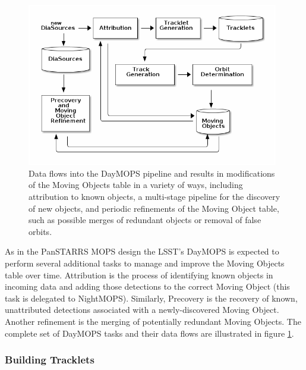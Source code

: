 \documentclass[12pt,preprint]{aastex}
\begin{document}
\begin{figure}[h]
\begin{center}
  \includegraphics[width=11cm]{illustrations/mopsDiagram.png}
\end{center}
\caption{ Data flows into the DayMOPS pipeline and results in
  modifications of the Moving Objects table in a variety of ways,
  including attribution to known objects, a multi-stage pipeline for
  the discovery of new objects, and periodic refinements of the Moving
  Object table, such as possible merges of redundant objects or
  removal of false orbits. }
\label{mopsDiagram}
\end{figure}



As in the PanSTARRS MOPS design \citep{psMOPSDesign} the LSST's
DayMOPS is expected to perform several additional tasks to manage and
improve the Moving Objects table over time.  Attribution is the
process of identifying known objects in incoming data and adding those
detections to the correct Moving Object (this task is delegated to
NightMOPS). Similarly, Precovery is the recovery of known,
unattributed detections associated with a newly-discovered Moving
Object.  Another refinement is the merging of potentially redundant
Moving Objects.  The complete set of DayMOPS tasks and their data
flows are illustrated in figure \ref{mopsDiagram}.



\subsubsection{Building Tracklets}

\end{document}
